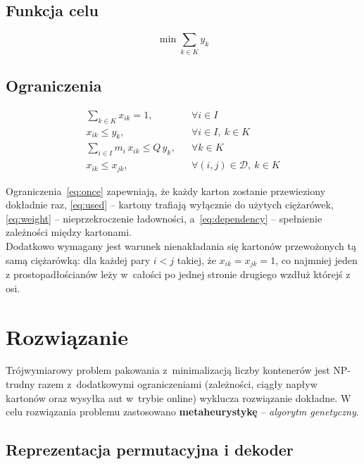 \documentclass[12pt]{article}
\begin{document}
\subsection{Funkcja celu}
\[
\min \sum_{k\in K} y_k
\]

\subsection{Ograniczenia}
\begin{align}
    \sum_{k\in K} x_{ik} = 1, & &\forall i\in I \label{eq:once}\\
    x_{ik} \le y_k, & &\forall i\in I,\ k\in K \label{eq:used}\\
    \sum_{i\in I} m_i\,x_{ik} \le Q\,y_k, & &\forall k\in K \label{eq:weight}\\
    x_{ik} \le x_{jk}, & &\forall (i,j)\in\mathcal{D},\ k\in K \label{eq:dependency}
\end{align}


Ograniczenia~\eqref{eq:once} zapewniają, że każdy karton zostanie przewieziony dokładnie raz, \eqref{eq:used} -- kartony trafiają wyłącznie do użytych ciężarówek, \eqref{eq:weight} -- nieprzekroczenie ładowności, a~\eqref{eq:dependency} -- spełnienie zależności między kartonami. \\
Dodatkowo wymagany jest warunek nienakładania się kartonów przewożonych tą samą ciężarówką: dla każdej pary $i<j$ takiej, że $x_{ik}=x_{jk}=1$, co najmniej jeden z prostopadłościanów leży w~całości po jednej stronie drugiego wzdłuż którejś z osi.

\section{Rozwiązanie}

Trójwymiarowy problem pakowania z~minimalizacją liczby kontenerów jest NP-trudny razem z~dodatkowymi ograniczeniami (zależności, ciągły napływ kartonów oraz wysyłka aut w~trybie online) wyklucza rozwiązanie dokładne. W celu rozwiązania problemu zastosowano \textbf{metaheurystykę} -- \textit{algorytm genetyczny}.

\subsection{Reprezentacja permutacyjna i dekoder}
\end{document}
